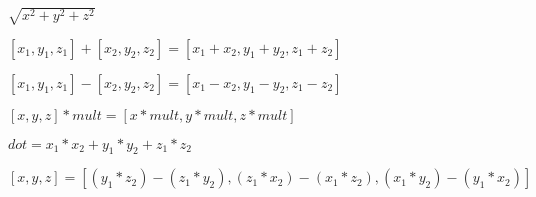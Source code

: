 \documentclass{article}
\begin{document}
$\sqrt{x^2+y^2+z^2}$
\pagebreak

$[x_1,y_1,z_1] + [x_2,y_2,z_2] = [x_1+x_2,y_1+y_2,z_1+z_2]$
\pagebreak

$[x_1,y_1,z_1] - [x_2,y_2,z_2] = [x_1-x_2,y_1-y_2,z_1-z_2]$
\pagebreak

$[x,y,z] * mult = [x*mult,y*mult,z*mult]$
\pagebreak

$dot = x_1*x_2 + y_1*y_2 + z_1*z_2$
\pagebreak

$[x,y,z] = [(y_1*z_2) - (z_1*y_2),(z_1*x_2) - (x_1*z_2),(x_1*y_2) - (y_1*x_2)]$
\pagebreak
\end{document}
